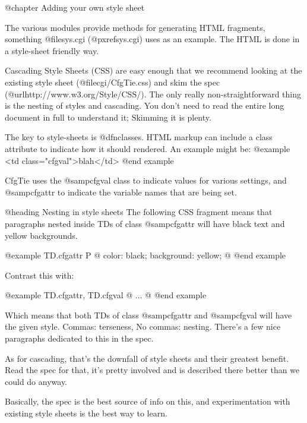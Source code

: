 @chapter Adding your own style sheet

The various modules provide methods for generating HTML fragments, something
@file{sys.cgi} (@pxref{sys.cgi}) uses as an example.  The HTML is done in a
style-sheet friendly way.

Cascading Style Sheets (CSS) are easy enough that we recommend looking at the
existing style sheet (@file{cgi/CfgTie.css}) and skim the spec
(@url{http://www.w3.org/Style/CSS/}). The only really non-straightforward thing
is the nesting of styles and cascading. You don't need to read the entire long
document in full to understand it; Skimming it is plenty.

The key to style-sheets is @dfn{classes}.  HTML markup can include a class
attribute to indicate how it should rendered.  An example might be:
@example
	<td class="cfgval">blah</td>
@end example

CfgTie uses the @samp{cfgval} class to indicate values for various settings,
and @samp{cfgattr} to indicate the variable names that are being set.

@heading Nesting in style sheets
The following CSS fragment means that paragraphs nested inside TDs of class
@samp{cfgattr}  will have black text and yellow backgrounds. 

@example
   TD.cfgattr P @{ color: black; background: yellow; @}
@end example

Contrast this with:

@example
   TD.cfgattr, TD.cfgval @{ ... @}
@end example

Which means that both TDs of class @samp{cfgattr} and @samp{cfgval} will have
the given style. Commas: terseness, No commas: nesting. There's a few nice
paragraphs dedicated to this in the spec.

As for cascading, that's the downfall of style sheets and their greatest
benefit. Read the spec for that, it's pretty involved and is described
there better than we could do anyway.

Basically, the spec is the best source of info on this, and experimentation
with existing style sheets is the best way to learn.
